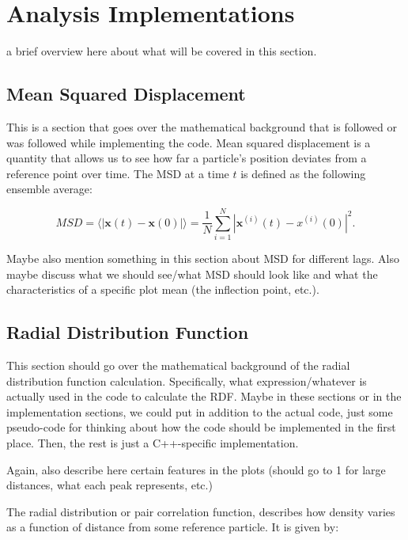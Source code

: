 \newpage
\section{Analysis Implementations}

a brief overview here about what will be covered in this section.

\subsection{Mean Squared Displacement}

This is a section that goes over the mathematical background that is followed
or was followed while implementing the code. Mean squared displacement is a 
quantity that allows us to see how far a particle's position deviates from a 
reference point over time. The MSD at a time $t$ is defined as the following
ensemble average:

\begin{equation*}
    MSD = \langle| \mathbf{x}(t) - \mathbf{x}(0)|\rangle = \frac{1}{N} \sum_{i=1}^N 
    |\mathbf{x}^{(i)}(t) - x^{(i)}(0)|^2.
\end{equation*}

Maybe also mention something in this section about MSD for different lags. Also
maybe discuss what we should see/what MSD should look like and what the 
characteristics of a specific plot mean (the inflection point, etc.).



\subsection{Radial Distribution Function}

This section should go over the mathematical background of the radial
distribution function calculation. Specifically, what expression/whatever is 
actually used in the code to calculate the RDF. Maybe in these sections or in 
the implementation sections, we could put in addition to the actual code, just
some pseudo-code for thinking about how the code should be implemented in the
first place. Then, the rest is just a C++-specific implementation.

Again, also describe here certain features in the plots (should go to 1 for
large distances, what each peak represents, etc.)

The radial distribution or pair correlation function, describes how density
varies as a function of distance from some reference particle. It is given by:

